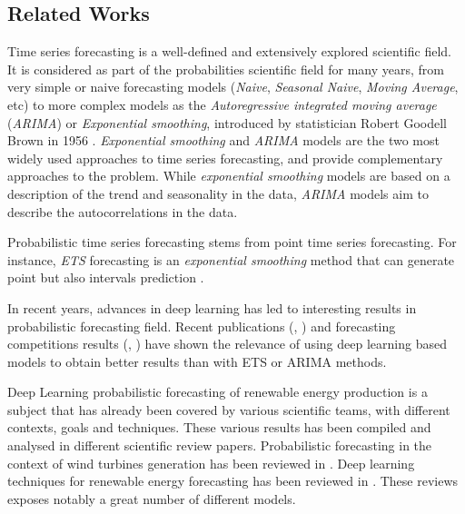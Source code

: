 \subsection{Related Works}


Time series forecasting is a well-defined and extensively explored scientific field. It is considered as part of the probabilities scientific field for many years, from very simple or naive forecasting models (\textit{Naive}, \textit{Seasonal Naive}, \textit{Moving Average}, etc) \cite{forecasting_principle1} to more complex models as the \textit{Autoregressive integrated moving average} (\textit{ARIMA}) \cite{forecasting_principle2} or \textit{Exponential smoothing}, introduced by statistician Robert Goodell Brown in 1956 \cite{smooth_for}.
\textit{Exponential smoothing} and \textit{ARIMA} models are the two most widely used approaches to time series forecasting, and provide complementary approaches to the problem. While \textit{exponential smoothing} models are based on a description of the trend and seasonality in the data, \textit{ARIMA} models aim to describe the autocorrelations in the data.

Probabilistic time series forecasting stems from point time series forecasting. For instance, \textit{ETS} forecasting is an \textit{exponential smoothing} method that can generate point but also intervals prediction \cite{exp_smooth}. 

In recent years, advances in deep learning has led to interesting results in probabilistic forecasting field. Recent publications (\cite{deep_factors_gp}, \cite{multi_horizon_quantile}) and forecasting competitions results (\cite{extreme_event_for_nn}, \cite{m4_competition})  have shown the relevance of using deep learning based models to obtain better results than with ETS or ARIMA methods.

Deep Learning probabilistic forecasting of renewable energy production is a subject that has already been covered by various scientific teams, with different contexts, goals and techniques. These various results has been compiled and analysed in different scientific review papers. Probabilistic forecasting in the context of wind turbines generation has been reviewed in \cite{review_prob_for_wind}. Deep learning techniques for renewable energy forecasting has been reviewed in \cite{review_deep_renewable_for}. These reviews exposes notably a great number of different models.

